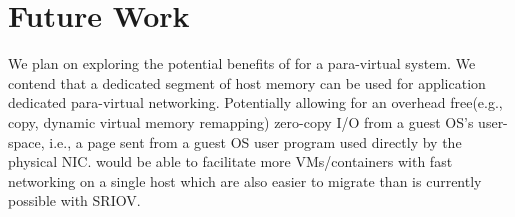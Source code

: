 
\section{Future Work}


We plan on exploring the potential benefits of \oursys for a para-virtual system. We contend that a dedicated segment of host memory can be used for application dedicated para-virtual networking. Potentially allowing for an overhead free(e.g., copy, dynamic virtual memory remapping) zero-copy I/O from a guest OS's user-space, i.e., a \oursys page sent from a guest OS user program used directly by the physical NIC. \oursys would be able to facilitate more VMs/containers with fast networking on a single host  which are also easier to migrate than is currently possible with SRIOV.



